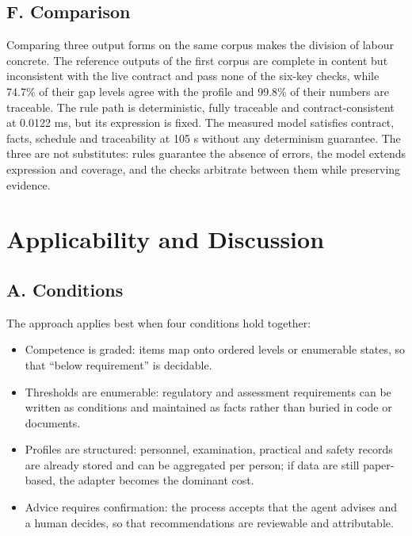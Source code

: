 \documentclass[conference]{IEEEtran}
\begin{document}
\subsection{F. Comparison}

Comparing three output forms on the same corpus makes the division of labour concrete. The reference outputs of the first corpus are complete in content but inconsistent with the live contract and pass none of the six-key checks, while 74.7\% of their gap levels agree with the profile and 99.8\% of their numbers are traceable. The rule path is deterministic, fully traceable and contract-consistent at 0.0122 ms, but its expression is fixed. The measured model satisfies contract, facts, schedule and traceability at 105 s without any determinism guarantee. The three are not substitutes: rules guarantee the absence of errors, the model extends expression and coverage, and the checks arbitrate between them while preserving evidence.


\section{Applicability and Discussion}

\subsection{A. Conditions}

The approach applies best when four conditions hold together:


\begin{itemize}

\item Competence is graded: items map onto ordered levels or enumerable states, so that ``below requirement'' is decidable.

\item Thresholds are enumerable: regulatory and assessment requirements can be written as conditions and maintained as facts rather than buried in code or documents.

\item Profiles are structured: personnel, examination, practical and safety records are already stored and can be aggregated per person; if data are still paper-based, the adapter becomes the dominant cost.

\item Advice requires confirmation: the process accepts that the agent advises and a human decides, so that recommendations are reviewable and attributable.

\end{itemize}
\end{document}
